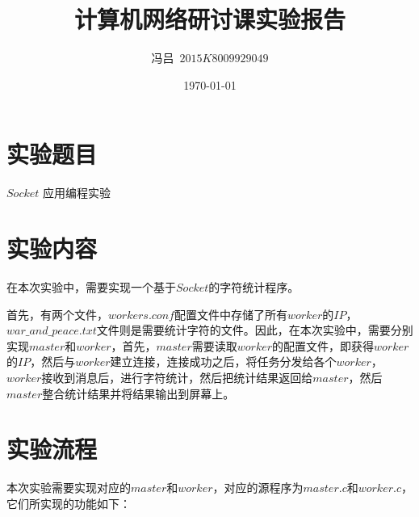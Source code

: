 \documentclass[UTF8,noindent]{ctexart}
\title{\CJKfamily{zhkai}计算机网络研讨课实验报告}
\author{{\CJKfamily{zhkai}冯吕}\ $2015K8009929049$}
\date{\today}
\begin{document}
\maketitle
{}
\section*{{实验题目}}$Socket$ 应用编程实验
\section*{{实验内容}}在本次实验中，需要实现一个基于$Socket$的字符统计程序。

首先，有两个文件，$workers.conf$配置文件中存储了所有$worker$的$IP$，$war\_and\_peace.txt$文件则是需要统计字符的文件。因此，在本次实验中，需要分别实现$master$和$worker$，首先，$master$需要读取$worker$的配置文件，即获得$worker$的$IP$，然后与$worker$建立连接，连接成功之后，将任务分发给各个$worker$，$worker$接收到消息后，进行字符统计，然后把统计结果返回给$master$，然后$master$整合统计结果并将结果输出到屏幕上。\\
		\section*{{实验流程}}
		本次实验需要实现对应的$master$和$worker$，对应的源程序为$master.c$和$worker.c$，它们所实现的功能如下：
\end{document}
